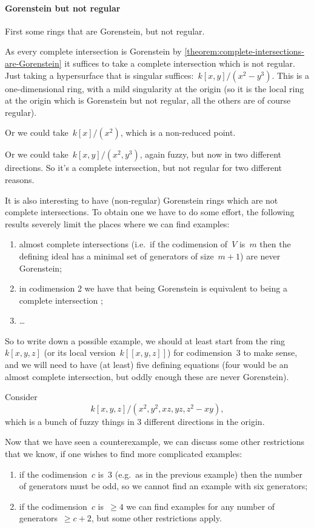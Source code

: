 \documentclass[10pt,a4paper]{article}
\begin{document}
\paragraph{Gorenstein but not regular}
First some rings that are Gorenstein, but not regular.
\begin{example}
  As every complete intersection is Gorenstein by \cref{theorem:complete-intersections-are-Gorenstein} it suffices to take a complete intersection which is not regular. Just taking a hypersurface that is singular suffices:~$k[x,y]/(x^2-y^3)$. This is a one-dimensional ring, with a mild singularity at the origin (so it is the local ring at the origin which is Gorenstein but not regular, all the others are of course regular).
\end{example}
\begin{example}
  Or we could take~$k[x]/(x^2)$, which is a non-reduced point.
\end{example}
\begin{example}
  Or we could take~$k[x,y]/(x^2,y^3)$, again fuzzy, but now in two different directions. So it's a complete intersection, but not regular for two different reasons.
\end{example}
It is also interesting to have (non-regular) Gorenstein rings which are not complete intersections. To obtain one we have to do some effort, the following results severely limit the places where we can find examples:
\begin{enumerate}
  \item almost complete intersections (i.e.\ if the codimension of~$V$ is~$m$ then the defining ideal has a minimal set of generators of size~$m+1$) are never Gorenstein;
  \item in codimension 2 we have that being Gorenstein is equivalent to being a complete intersection \cite[corollary 21.20]{eisenbud-commutative-algebra};
  \item \ldots
\end{enumerate}
So to write down a possible example, we should at least start from the ring~$k[x,y,z]$ (or its local version~$k[[x,y,z]]$) for codimension~$3$ to make sense, and we will need to have (at least) five defining equations (four would be an almost complete intersection, but oddly enough these are never Gorenstein).
\begin{example}
  Consider
  \begin{equation}
    k[x,y,z]/(x^2,y^2,xz,yz,z^2-xy),
  \end{equation}
  which is a bunch of fuzzy things in 3 different directions in the origin.
\end{example}
Now that we have seen a counterexample, we can discuss some other restrictions that we know, if one wishes to find more complicated examples:
\begin{enumerate}
  \item if the codimension~$c$ is~3 (e.g.\ as in the previous example) then the number of generators must be odd, so we cannot find an example with six generators;
  \item if the codimension~$c$ is~$\geq 4$ we can find examples for any number of generators~$\geq c+2$, but some other restrictions apply.
\end{enumerate}
\end{document}
